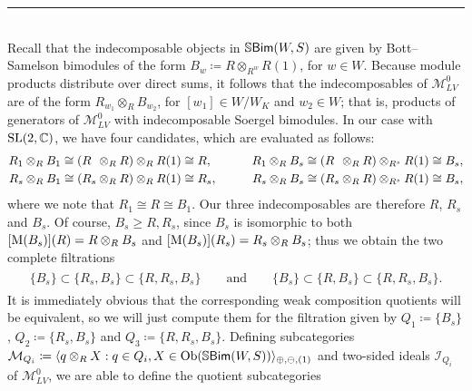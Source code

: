 \begin{example}
\begin{center}
\rule{0.5\linewidth}{1pt}
\end{center}
\noindent\\[-\baselineskip]
\noindent Recall that the indecomposable objects in $\mathbb{S}\textnormal{\textsf{Bim}}(W, S)$ are given by Bott--Samelson bimodules of the form $B_w \coloneqq R \otimes_{R^w} R(1)$, for $w \in W$. Because module products distribute over direct sums, it follows that the indecomposables of $\mathcal{M}_{LV}^0$ are of the form $R_{w_1} \otimes_R B_{w_2}$, for $[w_1] \in W/W_K$ and $w_2 \in W$; that is, products of generators of $\mathcal{M}_{LV}^0$ with indecomposable Soergel bimodules. In our case with $\textnormal{SL}(2, \mathbb{C})$, we have four candidates, which are evaluated as follows:
\begin{alignat*}{2}
R_1 \otimes_R B_1 \cong (R\hphantom{{}_{s}} \otimes_R R) \otimes_R R(1) &\cong R,&\qquad R_1 \otimes_R B_{s} \cong (R\hphantom{{}_{s}} \otimes_R R) \otimes_{R^{s}} R(1) &\cong B_{s},\\
R_{s} \otimes_R B_1 \cong (R_{s} \otimes_R R) \otimes_R R(1) &\cong R_{s},&\qquad R_{s} \otimes_R B_{s} \cong (R_{s} \otimes_R R) \otimes_{R^{s}} R(1) &\cong B_{s},
\end{alignat*}
\noindent where we note that $R_1 \cong R \cong B_1$. Our three indecomposables are therefore $R$, $R_{s}$ and $B_{s}$. Of course, $B_{s} \geq R, R_{s}$, since $B_{s}$ is isomorphic to both $[\textnormal{M}(B_{s})](R) = R \otimes_R B_{s}$ and $[\textnormal{M}(B_{s})](R_{s}) = R_{s} \otimes_R B_{s}$; thus we obtain the two complete filtrations
\begin{align*}
\begin{split}
\{B_{s}\} \subset \{R_{s}, B_{s}\} \subset \{R, R_{s}, B_{s}\}\qquad\text{and}\qquad\{B_{s}\} \subset \{R, B_{s}\} \subset \{R, R_{s}, B_{s}\}.
\end{split}
\end{align*}
\newpage
\noindent It is immediately obvious that the corresponding weak composition quotients will be equivalent, so we will just compute them for the filtration given by $Q_1 \coloneqq \{B_{s}\}$, $Q_2 \coloneqq \{R_{s}, B_{s}\}$ and $Q_3 \coloneqq \{R, R_{s}, B_{s}\}$. Defining subcategories $\mathcal{M}_{Q_i} \coloneqq \langle q \otimes_R X : q \in Q_i, X \in \textnormal{Ob}(\mathbb{S}\textnormal{\textsf{Bim}}(W, S))\rangle_{\oplus,\ominus,(1)}$ and two-sided ideals $\mathcal{I}_{Q_i}$ of $\mathcal{M}_{LV}^0$, we are able to define the quotient subcategories
\begin{align*}

\end{align*}
\end{example}
